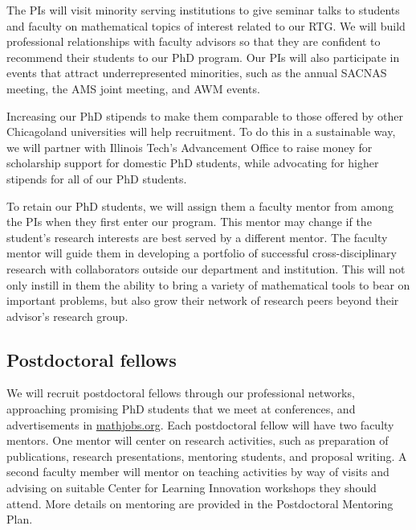 \documentclass[11pt]{NSFamsart}
\begin{document}

The PIs will visit minority serving institutions to give seminar talks to students and faculty on mathematical topics of interest related to our RTG.  We will build professional relationships with faculty advisors so that they are confident to recommend their students to our PhD program.  Our PIs will also participate in events that attract underrepresented minorities, such as the annual SACNAS meeting, the AMS joint meeting, and AWM events.

Increasing our PhD stipends to make them comparable to those offered by other Chicagoland universities will help recruitment. To do this in a sustainable way, we will partner with Illinois Tech's Advancement Office to raise money for scholarship support for domestic PhD students, while advocating for higher stipends for all of our PhD students.

To retain our PhD students, we will assign them a faculty mentor from among the PIs when they first enter our program.  This mentor may change if the student's research interests are best served by a different mentor.  The faculty mentor will guide them in developing a portfolio of successful cross-disciplinary research with collaborators outside our department and institution.  This will not only instill in them the ability to bring a variety of mathematical tools to bear on important problems, but also grow their network of research peers beyond their advisor's research group.



\subsection*{Postdoctoral fellows}
We will recruit postdoctoral fellows through our professional networks, approaching promising PhD students that we meet at conferences, and advertisements in \url{mathjobs.org}. Each postdoctoral fellow will have two faculty mentors. One mentor will center on research activities, such as preparation of 
publications, research presentations, mentoring students, and proposal writing. A second faculty member will mentor on teaching activities by way of visits and advising on suitable Center for Learning Innovation workshops they should attend. More details on mentoring are provided in the Postdoctoral Mentoring Plan.
\end{document}

